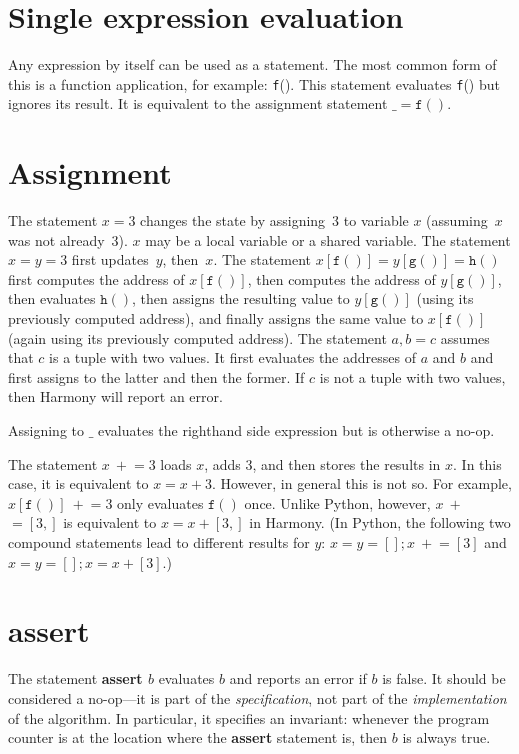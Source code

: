 \documentclass{report}
\begin{document}
\section{Single expression evaluation}

Any expression by itself can be used as a statement.  The most common
form of this is a function application, for example: \texttt{f}().
This statement evaluates \texttt{f}() but ignores its result.
It is equivalent to the assignment statement $\_ = \mathtt{f}()$.

\section{Assignment}

The statement $x = 3$ changes the state by assigning~3 to
variable $x$ (assuming~$x$ was not already~3).
$x$ may be a local variable or a shared variable.
The statement $x = y = 3$ first updates~$y$, then~$x$.
The statement $x[\mathtt{f}()] = y[\mathtt{g}()] = \mathtt{h}()$ first computes
the address of $x[\mathtt{f}()]$, then computes the address of
$y[\mathtt{g}()]$, then evaluates $\mathtt{h}()$, then assigns the resulting value to $y[\mathtt{g}()]$ (using its previously computed address), and finally assigns the same value to $x[\mathtt{f}()]$ (again using its previously computed address).
The statement $a,b = c$ assumes that $c$ is a tuple with two values.
It first evaluates the addresses of $a$ and $b$ and first assigns to
the latter and then the former.
If $c$ is not a tuple with two values, then Harmony will report an error.

Assigning to $\_$ evaluates the righthand side expression but is otherwise
a no-op.

The statement $x~+$$= 3$ loads $x$, adds 3, and then stores the
results in $x$.  In this case, it is equivalent to $x = x + 3$.
However, in general this is not so.  For example, $x[\mathtt{f}()]~+$$= 3$
only evaluates $\mathtt{f}()$ once.  Unlike Python, however,
$x~+$$= [3,]$ is equivalent to $x = x + [3,]$ in Harmony.
(In Python, the following two compound statements lead to different results
for $y$: $x = y = []; x~+$$= [3]$ and $x = y = []; x = x + [3]$.)

\section{\textbf{assert}}

The statement \textbf{assert $b$} evaluates $b$ and reports an error
if $b$ is false.  It should be considered a no-op---it is part of the
\emph{specification}, not part of the \emph{implementation} of the algorithm.
In particular, it specifies an invariant: whenever the program counter is
at the location where the \textbf{assert} statement is, then $b$ is
always true.
\end{document}
